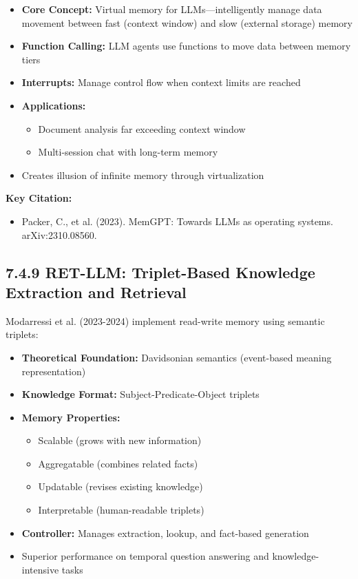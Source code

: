 \documentclass[11pt,letterpaper]{article}
\begin{document}
\begin{itemize}[leftmargin=*]
    \item \textbf{Core Concept:} Virtual memory for LLMs—intelligently manage data movement between fast (context window) and slow (external storage) memory
    \item \textbf{Function Calling:} LLM agents use functions to move data between memory tiers
    \item \textbf{Interrupts:} Manage control flow when context limits are reached
    \item \textbf{Applications:}
    \begin{itemize}
        \item Document analysis far exceeding context window
        \item Multi-session chat with long-term memory
    \end{itemize}
    \item Creates illusion of infinite memory through virtualization
\end{itemize}

\textbf{Key Citation:}
\begin{itemize}[leftmargin=*]
    \item Packer, C., et al. (2023). MemGPT: Towards LLMs as operating systems. arXiv:2310.08560.
\end{itemize}

\subsection{7.4.9 RET-LLM: Triplet-Based Knowledge Extraction and Retrieval}

Modarressi et al. (2023-2024) implement read-write memory using semantic triplets:

\begin{itemize}[leftmargin=*]
    \item \textbf{Theoretical Foundation:} Davidsonian semantics (event-based meaning representation)
    \item \textbf{Knowledge Format:} Subject-Predicate-Object triplets
    \item \textbf{Memory Properties:}
    \begin{itemize}
        \item Scalable (grows with new information)
        \item Aggregatable (combines related facts)
        \item Updatable (revises existing knowledge)
        \item Interpretable (human-readable triplets)
    \end{itemize}
    \item \textbf{Controller:} Manages extraction, lookup, and fact-based generation
    \item Superior performance on temporal question answering and knowledge-intensive tasks
\end{itemize}
\end{document}
